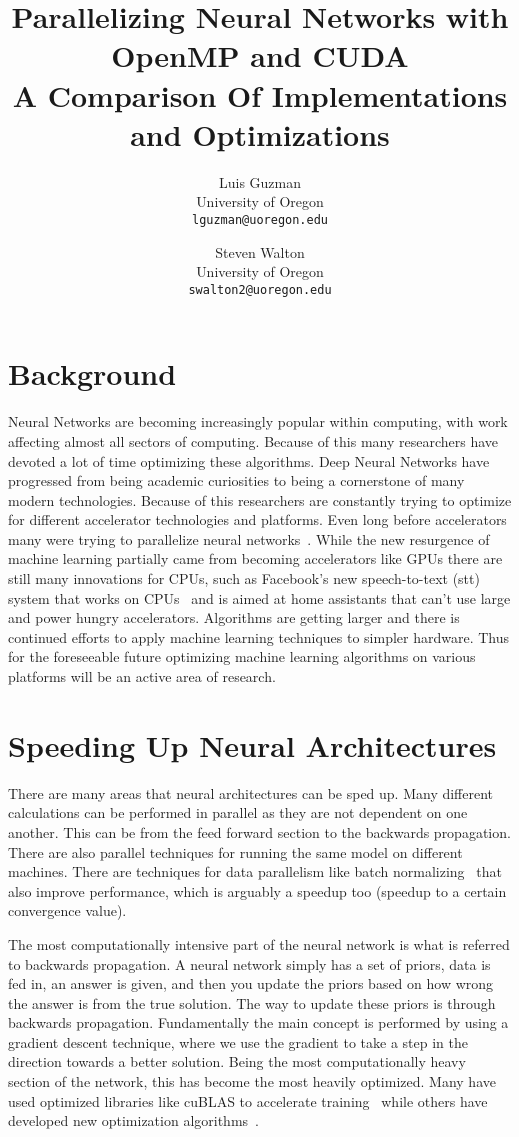\documentclass[10pt,twocolumn,letterpaper]{article}
\title{Parallelizing Neural Networks with OpenMP and CUDA\\
\small{A Comparison Of Implementations and Optimizations}}
\author{Luis Guzman\\
University of Oregon\\
{\tt\small lguzman@uoregon.edu}
\and
Steven Walton\\
University of Oregon\\
{\tt\small swalton2@uoregon.edu}
}
\begin{document}
 
%
\maketitle 
%
\section{Background} 
%
Neural Networks are becoming increasingly popular within computing, with work
affecting almost all sectors of computing. Because of this many researchers have
devoted a lot of time optimizing these algorithms. Deep Neural Networks have
progressed from being academic curiosities to being a cornerstone of many modern
technologies. Because of this researchers are constantly trying to optimize for
different accelerator technologies and platforms. Even long before accelerators
many were trying to parallelize neural networks~\cite{10.1007/BFb0024235}.
While the new resurgence of machine learning partially came from becoming
accelerators like GPUs there are still many innovations for CPUs,
such as Facebook's new speech-to-text (stt) system that works on
CPUs~\cite{fbcpu} and is aimed at home assistants that can't use large and power
hungry accelerators. Algorithms are getting larger and there is continued
efforts to apply machine learning techniques to simpler hardware. Thus for the
foreseeable future optimizing machine learning algorithms on various platforms
will be an active area of research.  

\section{Speeding Up Neural Architectures}
%
There are many areas that neural architectures can be sped up. Many different
calculations can be performed in parallel as they are not dependent on one
another. This can be from the feed forward section to the backwards propagation.
There are also parallel techniques for running the same model on different
machines. There are techniques for data parallelism like batch 
normalizing~\cite{DBLP:journals/corr/IoffeS15} that also improve performance,
which is arguably a speedup too (speedup to a certain convergence value). 

The most computationally intensive part of the neural network is what is
referred to backwards propagation. A neural network simply has a set of priors,
data is fed in, an answer is given, and then you update the priors based on how
wrong the answer is from the true solution. The way to update these priors is
through backwards propagation. Fundamentally the main concept is performed by
using a gradient descent technique, where we use the gradient to take a step in
the direction towards a better solution. Being the most computationally heavy
section of the network, this has become the most heavily optimized. Many have
used optimized libraries like cuBLAS to accelerate training~\cite{5708849} while
others have developed new optimization algorithms~\cite{DBLP:journals/corr/KingmaB14}. 
\end{document}
